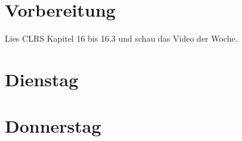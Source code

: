 \documentclass{uebung_cs}
\begin{document}
\section*{Vorbereitung}
Lies CLRS Kapitel 16 bis 16.3 und schau das Video der Woche.

\section*{Dienstag}
\begin{aufgabe}[test]
\end{aufgabe}

\section*{Donnerstag}
\begin{aufgabe}[test]
\end{aufgabe}
\end{document}

